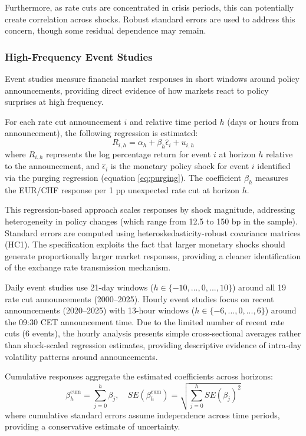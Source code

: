 \documentclass[12pt,a4paper]{article}
\begin{document}
Furthermore, as rate cuts are concentrated in crisis periods, this can potentially create correlation across shocks. Robust standard errors are used to address this concern, though some residual dependence may remain.
\newpage
\subsubsection{High-Frequency Event Studies}

Event studies measure financial market responses in short windows around policy announcements, providing direct evidence of how markets react to policy surprises at high frequency.

For each rate cut announcement $i$ and relative time period $h$ (days or hours from announcement), the following regression is estimated:
\begin{equation}
	R_{i,h} = \alpha_h + \beta_h \hat{\epsilon}_i + u_{i,h}
	\label{eq:event_regression}
\end{equation}
where $R_{i,h}$ represents the log percentage return for event $i$ at horizon $h$ relative to the announcement, and $\hat{\epsilon}_i$ is the monetary policy shock for event $i$ identified via the purging regression (equation \ref{eq:purging}). The coefficient $\beta_h$ measures the EUR/CHF response per 1 pp unexpected rate cut at horizon $h$.

This regression-based approach scales responses by shock magnitude, addressing heterogeneity in policy changes (which range from 12.5 to 150 bp in the sample). Standard errors are computed using heteroskedasticity-robust covariance matrices (HC1). The specification exploits the fact that larger monetary shocks should generate proportionally larger market responses, providing a cleaner identification of the exchange rate transmission mechanism.

Daily event studies use 21-day windows ($h \in \{-10, ..., 0, ..., 10\}$) around all 19 rate cut announcements (2000--2025). Hourly event studies focus on recent announcements (2020--2025) with 13-hour windows ($h \in \{-6, ..., 0, ..., 6\}$) around the 09:30 CET announcement time. Due to the limited number of recent rate cuts (6 events), the hourly analysis presents simple cross-sectional averages rather than shock-scaled regression estimates, providing descriptive evidence of intra-day volatility patterns around announcements.

Cumulative responses aggregate the estimated coefficients across horizons:
\begin{equation}
	\beta_h^{\text{cum}} = \sum_{j=0}^{h} \beta_j, \quad SE(\beta_h^{\text{cum}}) = \sqrt{\sum_{j=0}^{h} SE(\beta_j)^2}
	\label{eq:cumulative_response}
\end{equation}
where cumulative standard errors assume independence across time periods, providing a conservative estimate of uncertainty.
\end{document}
